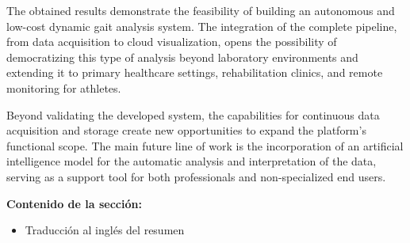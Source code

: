 The obtained results demonstrate the feasibility of building an autonomous and low-cost dynamic gait analysis system. The integration of the complete pipeline, from data acquisition to cloud visualization, opens the possibility of democratizing this type of analysis beyond laboratory environments and extending it to primary healthcare settings, rehabilitation clinics, and remote monitoring for athletes.

Beyond validating the developed system, the capabilities for continuous data acquisition and storage create new opportunities to expand the platform’s functional scope. The main future line of work is the incorporation of an artificial intelligence model for the automatic analysis and interpretation of the data, serving as a support tool for both professionals and non-specialized end users.


\textbf{Contenido de la sección:}
\begin{itemize}
    \item Traducción al inglés del resumen
\end{itemize}